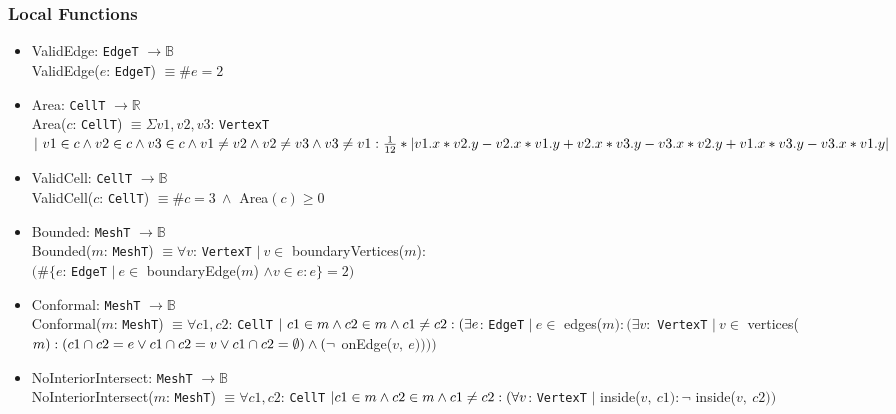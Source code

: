 \documentclass[12pt,titlepage]{article}
\begin{document}
\subsubsection{Local Functions} 
\begin{itemize}

\item ValidEdge: {\tt EdgeT} $\rightarrow \mathbb{B}$\\
ValidEdge($e$: {\tt EdgeT}) $\equiv \# e = 2$
\item Area: {\tt CellT} $\rightarrow \mathbb{R}$\\
Area($c$: {\tt CellT}) $\equiv \Sigma v1,v2,v3$: {\tt VertexT} $|\ v1\in c \wedge v2\in c \wedge v3\in c \\
\wedge v1\neq v2 \wedge v2\neq v3 \wedge v3\neq v1:\\
\frac{1}{12}* |v1.x*v2.y - v2.x*v1.y +\\
v2.x*v3.y - v3.x*v2.y +\\
v1.x*v3.y - v3.x*v1.y |$
\item ValidCell: {\tt CellT} $\rightarrow \mathbb{B}$\\
ValidCell($c$: {\tt CellT}) $\equiv \# c = 3\ \wedge$ Area$(c) \geq 0$
\item Bounded: {\tt MeshT} $\rightarrow \mathbb{B}$\\
Bounded($m$: {\tt MeshT}) $\equiv \forall v$: {\tt VertexT} $|\ v\in$ boundaryVertices($m$): \\
$(\# \{e$: {\tt EdgeT} $|\ e\in$ boundaryEdge($m$) $\wedge v\in e: e\}=2)$

\item Conformal: {\tt MeshT} $\rightarrow \mathbb{B}$\\
Conformal($m$: {\tt MeshT}) $\equiv \forall c1, c2$: {\tt CellT} $|\ c1\in m \wedge c2\in m \wedge c1\neq c2 : \\
(\exists e$: {\tt EdgeT} $|\ e\in$ edges($m):(\exists v:$ {\tt VertexT} $|\ v\in$ vertices($m):\\
(c1\cap c2 = e \vee c1\cap c2 = v \vee c1\cap c2 = \emptyset) \wedge (\neg$ onEdge($v,\ e))  ))$

\item NoInteriorIntersect: {\tt MeshT} $\rightarrow \mathbb{B}$\\
NoInteriorIntersect($m$: {\tt MeshT}) $\equiv \forall c1, c2$: {\tt CellT} $|\\ c1\in m \wedge c2\in m \wedge c1 \neq c2:
(\forall v$: {\tt VertexT} $|$ inside($v,\ c1): \neg$ inside($v,\ c2))$
 
\end{itemize}
\end{document}
